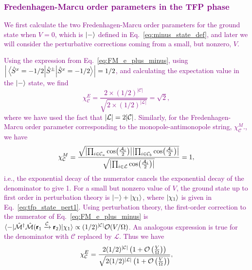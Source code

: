 \documentclass[twocolumn,superscriptaddress,amsmath,amssymb,aps,prx,nofootinbib]{revtex4-2}
\newcommand{\dual}[1]{\boldsymbol{\mathsf{#1}}}
\newcommand{\newtext}[1]{\textcolor{purple}{#1}}
\begin{document}
\newtext{\subsubsection{Fredenhagen-Marcu order parameters in the TFP phase}} \label{sec:FM_tfp}

\newtext{We first calculate the two Fredenhagen-Marcu order parameters for the ground state when $V = 0$, which is $\ket{-}$ defined in Eq.~\eqref{eq:minus_state_def}, and later we will consider the perturbative corrections coming from a small, but nonzero, $V$.} 

\newtext{Using the expression from Eq.~\eqref{eq:FM_e_plus_minus}, using $\abs{ \expval{ \hat{S}^{\pm}   }{\hat{S}^x = -1/2} } = 1/2$, and calculating the expectation value in the $\ket{-}$ state, we find 
\begin{equation}
    \chi_\mathcal{C}^E = \frac{2 \times (1/2)^{|\mathcal{C}|}}{\sqrt{ 2 \times (1/2)^{|\mathcal{L}|} }} = \sqrt{2},
\end{equation}
where we have used the fact that $\abs{\mathcal{L}} = 2 \abs{\mathcal{C}}$. Similarly, for the Fredenhagen-Marcu order parameter corresponding to the monopole-antimonopole string, $\chi_\mathcal{C}^M$., we have
\begin{equation}
    \chi_\mathcal{C}^M = \frac{\sqrt{\abs{\prod_{i \in \mathcal{C}_a} \cos(\frac{\mathcal{A}_i}{2})}\abs{\prod_{i \in \mathcal{C}_b} \cos(\frac{\mathcal{A}_i}{2})}   }}{\sqrt{\abs{\prod_{i \in \mathcal{L}} \cos(\frac{\mathcal{A}_i}{2}) } }}=1,
\end{equation}
i.e., the exponential decay of the numerator cancels the exponential decay of the denominator to give 1. 
For a small but nonzero value of $V$, the ground state up to first order in perturbation theory is $\ket{-} + \ket{\chi_1}$, where $\ket{\chi_1}$ is given in Eq.~\eqref{eq:tfp_state_pert1}. Using perturbation theory, the first-order correction to the numerator of Eq.~\eqref{eq:FM_e_plus_minus} is $\langle - | \hat{\mathcal{M}}^\dagger \hat{\mathcal{M}} (\dual{r}_1 \xrightarrow{\mathcal{C}} \dual{r}_2) | \chi_1 \rangle \propto (1/2)^{\abs{\mathcal{C}}} \mathcal{O} (V/\Omega)$. An analogous expression is true for the denominator with $\mathcal{C}$ replaced by $\mathcal{L}$. Thus we have
\begin{equation}
    \chi_\mathcal{C}^E = \frac{ 2 (1/2)^{\abs{\mathcal{C}}} \left( 1+\mathcal{O} \left( \frac{V}{\Omega} \right)\right)}{\sqrt{2 (1/2)^{\abs{\mathcal{L}}} \left( 1+\mathcal{O} \left( \frac{V}{\Omega} \right)\right)}},
\end{equation}
}
\end{document}
